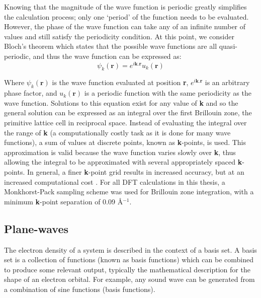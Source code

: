 Knowing that the magnitude of the wave function is periodic greatly simplifies the calculation process; only one `period' of the function needs to be evaluated. However, the phase of the wave function can take any of an infinite number of values and still satisfy the periodicity condition. At this point, we consider Bloch's theorem which states that the possible wave functions are all quasi-periodic, and thus the wave function can be expressed as:  %
\begin{equation}
\label{equation:bloch}
\psi_k(\textbf{r}) = e^{i\textbf{k}.\textbf{r}}u_k(\textbf{r})
\end{equation}

Where $\psi_k(\textbf{r})$ is the wave function evaluated at position \textbf{r}, $e^{i\textbf{k}.\textbf{r}}$ is an arbitrary phase factor, and $u_k(\textbf{r})$ is a periodic function with the same periodicity as the wave function. Solutions to this equation exist for any value of \textbf{k} and so the general solution can be expressed as an integral over the first Brillouin zone, the primitive lattice cell in reciprocal space. Instead of evaluating the integral over the range of \textbf{k} (a computationally costly task as it is done for many wave functions), a sum of values at discrete points, known as \textbf{k}-points, is used. This approximation is valid because the wave function varies slowly over \textbf{k}, thus allowing the integral to be approximated with several appropriately spaced \textbf{k}-points. In general, a finer \textbf{k}-point grid results in increased accuracy, but at an increased computational cost \cite{Hasnip2010}. For all DFT calculations in this thesis, a Monkhorst-Pack sampling scheme \cite{Monkhorst1976} was used for Brillouin zone integration, with a minimum \textbf{k}-point separation of 0.09 \r{A}$^{-1}$.

\subsection{Plane-waves}

The electron density of a system is described in the context of a basis set. A basis set is a collection of functions (known as basis functions) which can be combined to produce some relevant output, typically the mathematical description for the shape of an electron orbital. For example, any sound wave can be generated from a combination of sine functions (basis functions). 

